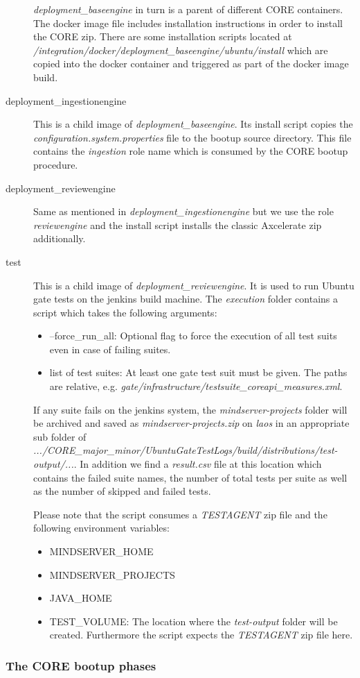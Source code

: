 \begin{description}
				\emph{deployment\_baseengine} in turn is a parent of different CORE containers. The docker image file includes installation instructions in order to install the CORE zip. There are some installation scripts located at \emph{/integration/docker/deployment\_baseengine/ubuntu/install} which are copied into the docker container and triggered as part of the docker image build.
				\item[deployment\_ingestionengine] This is a child image of \emph{deployment\_baseengine}. Its install script copies the \emph{configuration.system.properties} file to the bootup source directory. This file contains the \emph{ingestion} role name which is consumed by the CORE bootup procedure.
				\item[deployment\_reviewengine] Same as mentioned in \emph{deployment\_ingestionengine} but we use the role \emph{reviewengine} and the install script installs the classic Axcelerate zip additionally.
				\item[test] This is a child image of \emph{deployment\_reviewengine}. It is used to run Ubuntu gate tests on the jenkins build machine. The \emph{execution} folder contains a script which takes the following arguments:
				\begin{itemize}
					\item --force\_run\_all: Optional flag to force the execution of all test suits even in case of failing suites.
					\item list of test suites: At least one gate test suit must be given. The paths are relative, e.g. \emph{gate/infrastructure/testsuite\_coreapi\_measures.xml}.
				\end{itemize}
				If any suite fails on the jenkins system, the \emph{mindserver-projects} folder will be archived and saved as \emph{mindserver-projects.zip} on \emph{laos} in an appropriate sub folder of \emph{.../CORE\_major\_minor/UbuntuGateTestLogs/build/distributions/test-output/...}. In addition we find a \emph{result.csv} file at this location which contains the failed suite names, the number of total tests per suite as well as the number of skipped and failed tests.
				
				Please note that the script consumes a \emph{TESTAGENT} zip file and the following environment variables:
				\begin{itemize}
					\item MINDSERVER\_HOME
					\item MINDSERVER\_PROJECTS
					\item JAVA\_HOME
					\item TEST\_VOLUME: The location where the \emph{test-output} folder will be created. Furthermore the script expects the \emph{TESTAGENT} zip file here.
				\end{itemize}
			\end{description}
			
			\subsubsection{The CORE bootup phases}